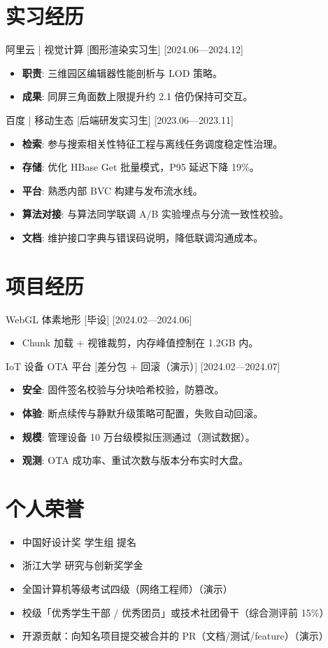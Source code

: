 \documentclass{resume-photo}
\begin{document}
\section{实习经历}
\ResumeItem
{阿里云 | 视觉计算}
[\textnormal{图形渲染实习生}]
[2024.06—2024.12]

\begin{itemize}
  \item \textbf{职责}: 三维园区编辑器性能剖析与 LOD 策略。
  \item \textbf{成果}: 同屏三角面数上限提升约 2.1 倍仍保持可交互。
\end{itemize}


\ResumeItem
{百度 | 移动生态}
[\textnormal{后端研发实习生}]
[2023.06—2023.11]

\begin{itemize}
  \item \textbf{检索}: 参与搜索相关性特征工程与离线任务调度稳定性治理。
  \item \textbf{存储}: 优化 HBase Get 批量模式，P95 延迟下降 19\%。
  \item \textbf{平台}: 熟悉内部 BVC 构建与发布流水线。
  \item \textbf{算法对接}: 与算法同学联调 A/B 实验埋点与分流一致性校验。
  \item \textbf{文档}: 维护接口字典与错误码说明，降低联调沟通成本。
\end{itemize}



\section{项目经历}
\ResumeItem
{WebGL 体素地形}
[\textnormal{毕设}]
[2024.02—2024.06]

\begin{itemize}
  \item Chunk 加载 + 视锥裁剪，内存峰值控制在 1.2GB 内。
\end{itemize}


\ResumeItem
{IoT 设备 OTA 平台}
[\textnormal{差分包 + 回滚（演示）}]
[2024.02—2024.07]

\begin{itemize}
  \item \textbf{安全}: 固件签名校验与分块哈希校验，防篡改。
  \item \textbf{体验}: 断点续传与静默升级策略可配置，失败自动回滚。
  \item \textbf{规模}: 管理设备 10 万台级模拟压测通过（测试数据）。
  \item \textbf{观测}: OTA 成功率、重试次数与版本分布实时大盘。
\end{itemize}



\section{个人荣誉}
\begin{itemize}
  \item 中国好设计奖 学生组 提名
  \item 浙江大学 研究与创新奖学金
  \item 全国计算机等级考试四级（网络工程师）（演示）
  \item 校级「优秀学生干部 / 优秀团员」或技术社团骨干（综合测评前 15\%）
  \item 开源贡献：向知名项目提交被合并的 PR（文档/测试/feature）（演示）
\end{itemize}
\end{document}
